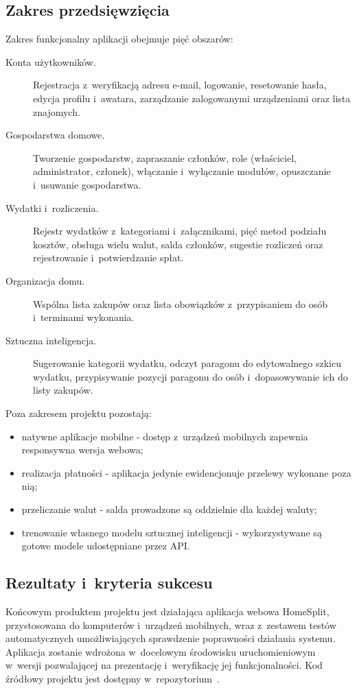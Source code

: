 \subsection{Zakres przedsięwzięcia}

Zakres funkcjonalny aplikacji obejmuje pięć obszarów:

\begin{description}
  \item[Konta użytkowników.] Rejestracja z~weryfikacją adresu e-mail, logowanie, resetowanie hasła, edycja profilu i~awatara, zarządzanie zalogowanymi urządzeniami oraz lista znajomych.
  \item[Gospodarstwa domowe.] Tworzenie gospodarstw, zapraszanie członków, role (właściciel, administrator, członek), włączanie i~wyłączanie modułów, opuszczanie i~usuwanie gospodarstwa.
  \item[Wydatki i~rozliczenia.] Rejestr wydatków z~kategoriami i~załącznikami, pięć metod podziału kosztów, obsługa wielu walut, salda członków, sugestie rozliczeń oraz rejestrowanie i~potwierdzanie spłat.
  \item[Organizacja domu.] Wspólna lista zakupów oraz lista obowiązków z~przypisaniem do osób i~terminami wykonania.
  \item[Sztuczna inteligencja.] Sugerowanie kategorii wydatku, odczyt paragonu do edytowalnego szkicu wydatku, przypisywanie pozycji paragonu do osób i~dopasowywanie ich do listy zakupów.
\end{description}

Poza zakresem projektu pozostają:

\begin{itemize}
  \item natywne aplikacje mobilne - dostęp z~urządzeń mobilnych zapewnia responsywna wersja webowa;
  \item realizacja płatności - aplikacja jedynie ewidencjonuje przelewy wykonane poza nią;
  \item przeliczanie walut - salda prowadzone są oddzielnie dla każdej waluty;
  \item trenowanie własnego modelu sztucznej inteligencji - wykorzystywane są gotowe modele udostępniane przez API.
\end{itemize}

\subsection{Rezultaty i~kryteria sukcesu}

Końcowym produktem projektu jest działająca aplikacja webowa HomeSplit, przystosowana do komputerów i~urządzeń mobilnych, wraz z~zestawem testów automatycznych umożliwiających sprawdzenie poprawności działania systemu. Aplikacja zostanie wdrożona w~docelowym środowisku uruchomieniowym w~wersji pozwalającej na prezentację i~weryfikację jej funkcjonalności. Kod źródłowy projektu jest dostępny w~repozytorium~\cite{homesplit}.

